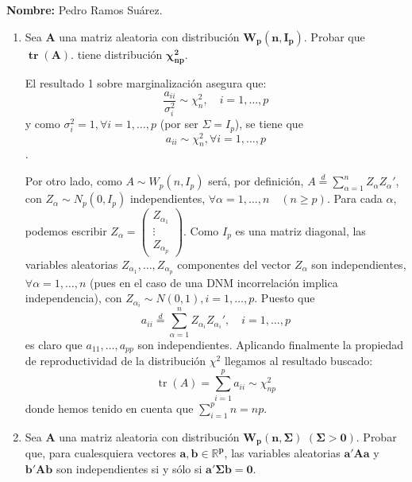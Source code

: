 \documentclass[11pt,a4paper]{article}
\begin{document}

\textbf{Nombre:} Pedro Ramos Suárez.

\begin{enumerate}[label=\arabic*.]
\bfseries
\item Sea $\mathbf{A}$ una matriz aleatoria con distribución $\mathbf{W_{p}(n, I_{p})}$. Probar que $\mathbf{\operatorname{tr}(A)}$. tiene distribución $\mathbf{\chi_{np}^{2}}$.


\vspace{0.5cm}
\normalfont

El resultado 1 sobre marginalización asegura que:
$$\frac{a_{ii}}{\sigma_{i}^{2}} \sim \chi_{n}^{2}, \quad i = 1, \dots, p$$
y como $\sigma_{i}^{2} = 1, \forall i = 1, \dots, p$ (por ser $\Sigma = I_{p}$), se tiene que
$$a_{ii} \sim \chi_{n}^{2}, \forall i = 1, \dots, p$$.

Por otro lado, como $A \sim W_{p}(n, I_{p})$ será, por definición, $A \overset{d}{=} \sum_{\alpha=1}^{n} Z_{\alpha}Z_{\alpha}'$, con $Z_{\alpha} \sim N_{p}(0, I_{p})$ independientes, $\forall \alpha = 1, \dots, n \quad (n \geq p)$. Para cada $\alpha$, podemos escribir $Z_{\alpha} = \begin{pmatrix} Z_{\alpha_{1}} \\ \vdots \\ Z_{\alpha_{p}} \end{pmatrix}$. Como $I_{p}$ es una matriz diagonal, las variables aleatorias $Z_{\alpha_{1}}, \dots, Z_{\alpha_{p}}$ componentes del vector $Z_{\alpha}$ son independientes, $\forall \alpha = 1, \dots, n$ (pues en el caso de una DNM incorrelación implica independencia), con $Z_{\alpha_{i}} \sim N(0, 1), i = 1, \dots, p$. Puesto que
$$a_{ii} \overset{d}{=} \sum_{\alpha=1}^{n} Z_{\alpha_{i}}Z_{\alpha_{i}}', \quad i = 1, \dots, p$$
es claro que $a_{11}, \dots, a_{pp}$ son independientes. Aplicando finalmente la propiedad de reproductividad de la distribución $\chi^{2}$ llegamos al resultado buscado:
$$\operatorname{tr}(A) = \sum_{i=1}^{p} a_{ii} \sim \chi_{np}^{2}$$
donde hemos tenido en cuenta que $\sum_{i=1}^{p} n = np$.

\newpage
\bfseries
\item Sea $\mathbf{A}$ una matriz aleatoria con distribución $\mathbf{W_{p}(n, \Sigma)}$ $\mathbf{(\Sigma > 0)}$. Probar que, para cualesquiera vectores $\mathbf{a, b \in \mathbb{R}^{p}}$, las variables aleatorias $\mathbf{a'Aa}$ y $\mathbf{b'Ab}$ son independientes si y sólo si $\mathbf{a' \Sigma b = 0}$.

\vspace{0.5cm}
\normalfont


\end{enumerate}
\end{document}

